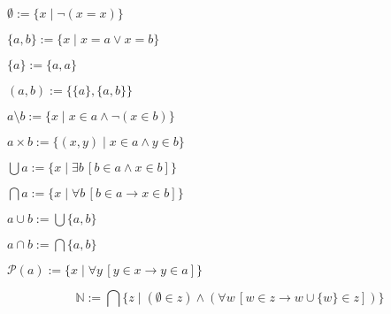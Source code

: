 \documentclass[11pt]{book}
\begin{document}
\begin{definition}$\emptyset:=\{x\mid \neg (x=x)\}$
\end{definition}
\begin{definition}$\{a,b\}:=\{x\mid x=a\lor x=b\}$
\end{definition}
\begin{definition}[Singleton]$\{a\}:=\{a,a\}$
\end{definition}
\iffalse
\begin{definition}[Finite Set]$\{a_1,\dots,a_n\}:=\{x\mid x=a_1\lor \cdots\lor x=a_n\}$
\end{definition}\fi
\begin{definition}[Tuple]$(a,b):=\{\{a\},\{a,b\}\}$
\end{definition}
\iffalse
\begin{definition}[Ordered List]$(a_1,\dots,a_n):=\left.\left(a_{1},\left(a_{2},\left(a_{3},\left(\ldots,\left(a_{n}, \emptyset\right) \ldots\right)\right)\right)\right)\right)$
\end{definition}\fi
\begin{definition}$a\setminus b:=\{x\mid x\in a\land \neg (x\in b)\}$
\end{definition}
\iffalse
\begin{definition}[Cartesian Product]$a_1\times \cdots\times a_n:=\{(x_1,\dots,x_n)\mid x_1\in a_1\land\cdots\land  x_n\in a_n\}$
\end{definition}\fi
\begin{definition}$a\times b:=\{(x,y)\mid x\in a\land y\in b\}$
\end{definition}
\begin{definition}$\bigcup a:=\{x\mid \exists b\, [b\in a\land x\in b]\}$
\end{definition}
\begin{definition}$\bigcap a:=\{x\mid \forall b\,[b\in a\rightarrow x\in b]\}$
\end{definition}
\begin{definition}[Union]$a\cup b:=\bigcup \{a,b\}$
\end{definition}
\begin{definition}[Intersection]$a\cap b:=\bigcap \{a,b\}$
\end{definition}
\begin{definition}$\mathcal{P}(a):=\{x\mid \forall y\,[y\in x\rightarrow y\in a]\}$
\end{definition}
\begin{definition} 
\[\mathbb{N}:=\bigcap\{z\mid (\emptyset\in z)\land (\forall w\,[w\in z\rightarrow w\cup \{w\}\in z])\}\]
\end{definition}
\end{document}
